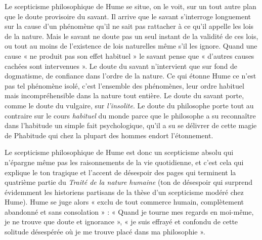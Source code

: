 Le scepticisme philosophique de Hume se situe, on le
voit, sur un tout autre plan que le doute provisoire du
savant. Il arrive que le savant s'interroge longuement
sur la cause d’un phénomène qu’il ne sait pas rattacher
à ce qu’il appelle les lois de la nature. Mais le savant ne
doute pas un seul instant de la validité de ces lois, ou
tout au moins de l’existence de lois naturelles même s’il
les ignore. Quand une cause « ne produit pas son effet
habituel » le savant pense que « d’autres causes cachées
sont intervenues ». Le doute du savant n'intervient que
sur fond de dogmatisme, de confiance dans l’ordre de la
nature. Ce qui étonne Hume ce n’est pas tel phénomène
isolé, c’est l’ensemble des phénomènes, leur ordre habituel
mais incompréhensible dans la nature tout entière. Le
doute du savant porte, comme le doute du vulgaire, sur
{\it l’insolite}. Le doute du philosophe porte tout au contraire
sur le cours {\it habituel} du monde parce que le philosophe
a su reconnaître dans l’habitude un simple fait psychologique, qu’il a su se délivrer de cette magie de Phabitude qui chez la plupart des hommes endort l’étonnement.

Le scepticisme philosophique de Hume est donc un
scepticisme absolu qui n’épargne même pas les raisonnements de la vie quotidienne, et c’est cela qui explique
le ton tragique et l’accent de désespoir des pages qui terminent la quatrième partie du {\it Traité de la nature humaine}
(ton de désespoir qui surprend évidemment les historiens
partisans de la thèse d’un scepticisme modéré chez Hume).
Hume se juge alors « exclu de tout commerce humain,
complètement abandonné et sans consolation » : « Quand
je tourne mes regards en moi-même, je ne trouve que
doute et ignorance », « je suis effrayé et confondu de cette
solitude désespérée où je me trouve placé dans ma philosophie ».

